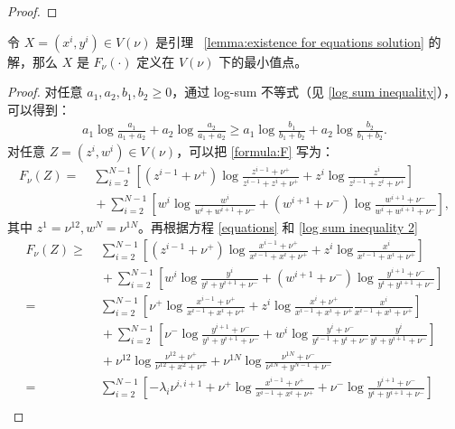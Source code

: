 \begin{appendices}
\begin{proof}
\end{proof}
\begin{lemma}\label{lemma:mininum}
    令 $X=(x^i,y^i)\in V(\nu)$ 是引理 ~\ref{lemma:existence for equations solution} 的解，那么 $X$ 是 $F_{\nu}(\cdot)$ 定义在 $V(\nu)$ 下的最小值点。 
\end{lemma}
\begin{proof}
    对任意 $a_1,a_2,b_1,b_2\ge 0$，通过 log-sum 不等式（见 \eqref{log sum inequality}），可以得到：
    \begin{align}\label{log sum inequality 2}
        a_1\log\frac{a_1}{a_1+a_2}+a_2\log\frac{a_2}{a_1+a_2}\ge a_1\log\frac{b_1}{b_1+b_2}+a_2\log\frac{b_2}{b_1+b_2}.
    \end{align}
    对任意 $Z=(z^i,w^i)\in V(\nu)$，可以把 \eqref{formula:F} 写为：
    \begin{align*}
        F_{\nu}(Z)
        =&\;\sum_{i=2}^{N-1}\left[ \left(z^{i-1}+\nu^+\right)\log\frac{z^{i-1}+\nu^+}{z^{i-1}+z^{i}+\nu^+} + z^{i}\log\frac{z^{i}}{z^{i-1}+z^{i}+\nu^+}  \right]\\
        &\;+\sum_{i=2}^{N-1}  \left[w^{i}\log\frac{w^{i}}{w^{i} +w^{i+1} +\nu^-} + \left(w^{i+1} +\nu^-\right)\log\frac{w^{i+1} +\nu^-}{w^{i} +w^{i+1} +\nu^-}\right],
    \end{align*}
    其中 $z^{1}=\nu^{12},w^{N}=\nu^{1N}$。再根据方程 \eqref{equations} 和 \eqref{log sum inequality 2}
    \begin{align*}
        F_{\nu}(Z)\ge &\;\sum_{i=2}^{N-1}\left[ \left(z^{i-1}+\nu^+\right)\log\frac{x^{i-1}+\nu^+}{x^{i-1}+x^{i}+\nu^+} + z^{i}\log\frac{x^{i}}{x^{i-1}+x^{i}+\nu^+}  \right]\\
        &\;+\sum_{i=2}^{N-1}  \left[w^{i}\log\frac{y^{i}}{y^{i} +y^{i+1} +\nu^-} + \left(w^{i+1} +\nu^-\right)\log\frac{y^{i+1} +\nu^-}{y^{i} +y^{i+1} +\nu^-}\right]\\
        =&\;\sum_{i=2}^{N-1}\left[ \nu^+\log\frac{x^{i-1}+\nu^+}{x^{i-1}+x^{i}+\nu^+} + z^{i}\log\frac{x^{i}+\nu^{+}}{x^{i-1}+x^{i}+\nu^{+}}\frac{x^{i}}{x^{i-1}+x^{i}+\nu^+}  \right]\\
        &\;+\sum_{i=2}^{N-1}  \left[\nu^-\log\frac{y^{i+1} +\nu^-}{y^{i} +y^{i+1} +\nu^-}+w^{i}\log\frac{y^{i}+\nu^{-}}{y^{i-1}+y^{i}+\nu^{-}}\frac{y^{i}}{y^{i} +y^{i+1} +\nu^-}  \right]\\
        &\;+\nu^{12}\log\frac{\nu^{12}+\nu^{+}}{\nu^{12}+x^{2}+\nu^{+}}+\nu^{1N}\log\frac{\nu^{1N}+\nu^{-}}{\nu^{1N}+y^{N-1}+\nu^{-}}\\
        =&\;\sum_{i=2}^{N-1}\left[-\lambda_i\nu^{i,i+1}+\nu^+\log\frac{x^{i-1}+\nu^+}{x^{i-1}+x^{i}+\nu^+}+\nu^-\log\frac{y^{i+1} +\nu^-}{y^{i} +y^{i+1} +\nu^-}\right]\\

\end{align*}
\end{proof}
\end{appendices}
